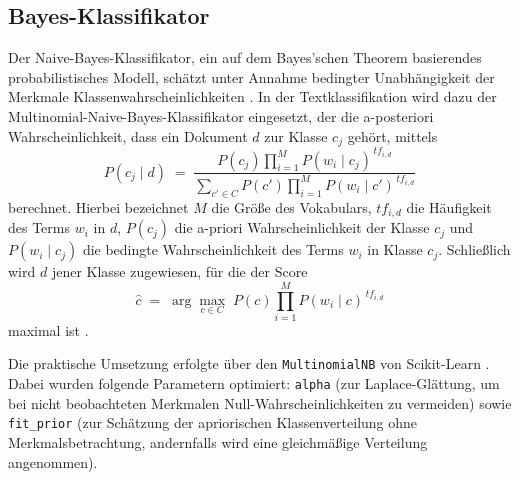 \subsection{Bayes-Klassifikator}
\label{sec:bayes-klassifikator}

Der Naive-Bayes-Klassifikator, ein auf dem Bayes'schen Theorem basierendes probabilistisches Modell, schätzt unter Annahme bedingter Unabhängigkeit der Merkmale Klassenwahrscheinlichkeiten \cite{Bishop2019}. In der Textklassifikation wird dazu der Multinomial-Naive-Bayes-Klassifikator eingesetzt, der die a-posteriori Wahrscheinlichkeit, dass ein Dokument $d$ zur Klasse $c_j$ gehört, mittels
\begin{equation*}
    P(c_j \mid d) \;=\; \frac{P(c_j) \prod_{i=1}^{M} P(w_i \mid c_j)^{\,tf_{i,d}}}{\displaystyle \sum_{c' \in C} P(c') \prod_{i=1}^{M} P(w_i \mid c')^{\,tf_{i,d}}}
\end{equation*}
berechnet. Hierbei bezeichnet $M$ die Größe des Vokabulars, $tf_{i,d}$ die Häufigkeit des Terms $w_i$ in $d$, $P(c_j)$ die a-priori Wahrscheinlichkeit der Klasse $c_j$ und $P(w_i \mid c_j)$ die bedingte Wahrscheinlichkeit des Terms $w_i$ in Klasse $c_j$. Schließlich wird $d$ jener Klasse zugewiesen, für die der Score
\begin{equation*}
    \hat{c} \;=\; \arg\max_{c \in C}\; P(c) \prod_{i=1}^{M} P(w_i \mid c)^{\,tf_{i,d}}
\end{equation*}
maximal ist \cite{Manning2009}.

Die praktische Umsetzung erfolgte über den \texttt{MultinomialNB} von Scikit-Learn \cite{Pedregosa2011}. Dabei wurden folgende Parametern optimiert: \texttt{alpha} (zur Laplace-Glättung, um bei nicht beobachteten Merkmalen Null-Wahrscheinlichkeiten zu vermeiden) sowie \texttt{fit\_prior} (zur Schätzung der apriorischen Klassenverteilung ohne Merkmalsbetrachtung, andernfalls wird eine gleichmäßige Verteilung angenommen).

